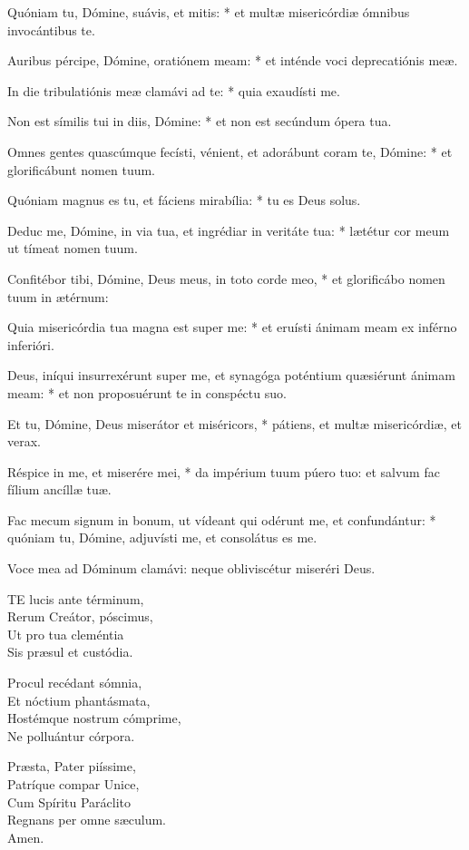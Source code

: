 Quóniam tu, Dómine, suávis, et mitis: * et multæ misericórdiæ ómnibus invocántibus te.

Auribus pércipe, Dómine, oratiónem meam: * et inténde voci deprecatiónis meæ.

In die tribulatiónis meæ clamávi ad te: * quia exaudísti me.

Non est símilis tui in diis, Dómine: * et non est secúndum ópera tua.

Omnes gentes quascúmque fecísti, vénient, et adorábunt coram te, Dómine: * et glorificábunt nomen tuum.

Quóniam magnus es tu, et fáciens mirabília: * tu es Deus solus.

Deduc me, Dómine, in via tua, et ingrédiar in veritáte tua: * lætétur cor meum ut tímeat nomen tuum.

Confitébor tibi, Dómine, Deus meus, in toto corde meo, * et glorificábo nomen tuum in ætérnum:

Quia misericórdia tua magna est super me: * et eruísti ánimam meam ex inférno inferióri.

Deus, iníqui insurrexérunt super me, et synagóga poténtium quæsiérunt ánimam meam: * et non proposuérunt te in conspéctu suo.

Et tu, Dómine, Deus miserátor et miséricors, * pátiens, et multæ misericórdiæ, et verax.

Réspice in me, et miserére mei, * da impérium tuum púero tuo: et salvum fac fílium ancíllæ tuæ.

Fac mecum signum in bonum, ut vídeant qui odérunt me, et confundántur: * quóniam tu, Dómine, adjuvísti me, et consolátus es me.

 Voce mea ad Dóminum clamávi: neque obliviscétur miseréri Deus.


\lettrine[lines=2]{T}{E} lucis ante términum,\\
Rerum Creátor, póscimus,\\
Ut pro tua cleméntia\\
Sis præsul et custódia.

Procul recédant sómnia,\\
Et nóctium phantásmata,\\
Hostémque nostrum cómprime,\\
Ne polluántur córpora.

Præsta, Pater piíssime,\\
Patríque compar Unice,\\
Cum Spíritu Paráclito\\
Regnans per omne sæculum.\\
Amen.

